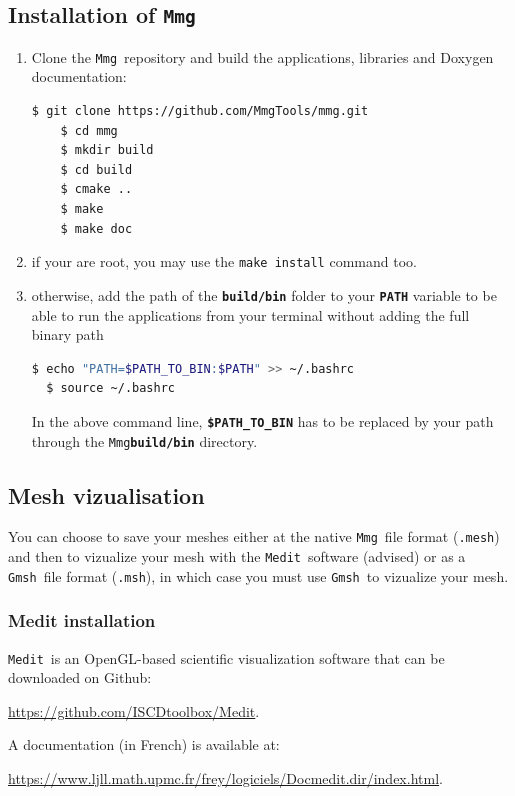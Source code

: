 \documentclass{article}
\newcommand{\ttb}[1]{\texttt{\textbf{#1}}}
\newcommand{\msh}{\texttt{.msh}}
\newcommand{\mesh}{\texttt{.mesh}}
\newcommand{\mmg}{\texttt{Mmg}}
\newcommand{\medit}{\texttt{Medit}}
\newcommand{\gmsh}{\texttt{Gmsh}}
\begin{document}
\subsection{Installation of \mmg}
\begin{enumerate}
\item Clone the \mmg\ repository and build the applications, libraries and Doxygen documentation:
  \begin{lstlisting}[language=bash,breaklines=true,breakindent=0pt,columns=fullflexible]
    $ git clone https://github.com/MmgTools/mmg.git
    $ cd mmg
    $ mkdir build
    $ cd build
    $ cmake ..
    $ make
    $ make doc
  \end{lstlisting}
\item if your are root, you may use the \texttt{make install} command too.
\item otherwise, add the path of the \ttb{build/bin} folder to your \ttb{PATH}
  variable to be able to run the applications from your terminal
  without adding the full binary path \begin{lstlisting}[language=bash]
  $ echo "PATH=$PATH_TO_BIN:$PATH" >> ~/.bashrc
  $ source ~/.bashrc
\end{lstlisting}
In the above command line, \ttb{\$PATH\_TO\_BIN} has to be replaced by your path through the \mmg \ttb{build/bin} directory.

\end{enumerate}

\subsection{Mesh vizualisation}
You can choose to save your meshes either at the native \mmg\ file format (\mesh) and then
to vizualize your mesh with the \medit\ software (advised) or as a \gmsh\ file
format (\msh), in which case you must use \gmsh\ to vizualize your mesh.

\subsubsection{Medit installation}
\medit\ is an OpenGL-based scientific visualization software that can be downloaded on Github:
\begin{center}
\url{https://github.com/ISCDtoolbox/Medit}.
\end{center}
 A documentation (in French) is available at:
 \begin{center}
\url{https://www.ljll.math.upmc.fr/frey/logiciels/Docmedit.dir/index.html}.
\end{center}
\end{document}
